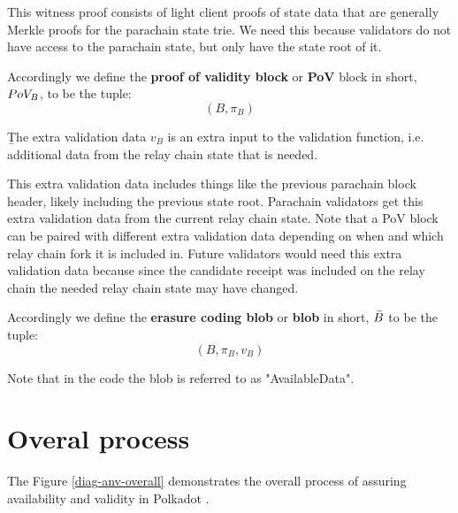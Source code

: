 This witness proof consists of light client proofs of state data that are generally Merkle proofs for the parachain state trie.  We need this because validators do not have access to the parachain state, but only have the state root of it.

\begin{definition}
  \label{defn-pov-block}
  Accordingly we define the {\bf proof of validity block} or {\bf PoV} block in short, {\bf $PoV_B$},
  to be the tuple:
  \[
  (B, \pi_B)
  \]
\end{definition}

\begin{definition}  \label{defn-extra-validation-data}
  {\b The extra validation data} $v_B$  is an extra input to the validation function, i.e. additional data from the relay chain state that is needed.
\end{definition}
This extra validation data includes things like the previous parachain block header, likely including the previous state root.
Parachain validators get this extra validation data from the current relay chain state. Note that a PoV block can be paired with different extra validation data depending on when and which relay chain fork it is included in. Future validators would need this extra validation data because since the candidate receipt was included on the relay chain the needed relay chain state may have changed.

\begin{definition}
  \label{defn-blob}
  Accordingly we define the {\bf erasure coding blob} or {\bf blob} in short, {\bf $\bar{B}$} to be the tuple:
  \[
  (B, \pi_B, v_B)
  \]
\end{definition}

Note that in the code the blob is referred to as "AvailableData".


\section{Overal process}

The Figure \ref{diag-anv-overall} demonstrates the overall process of assuring availability and validity in Polkadot .

